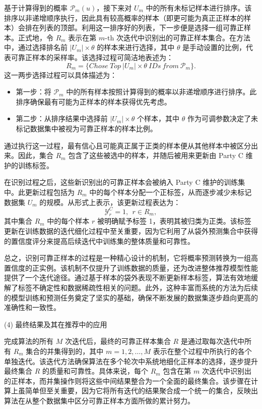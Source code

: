 基于计算得到的概率 ${{\mathsf{\mathcal{P}}}_{m}}(u)$，接下来对 ${{U}_{m}}$ 中的所有未标记样本进行排序。该排序以非递增顺序执行，因此具有较高概率的样本（即更可能为真正正样本的样本）会排在列表的顶部。利用这一排序好的列表，下一步便是选择一组可靠正样本。正式地，令 ${{R}_{m}}$ 表示在第 $m\text{-th}$ 次迭代中识别出的可靠正样本集合。在方法中，通过选择排名前 $|{{U}_{m}}|\times \theta$ 的样本来进行选择，其中 $\theta$ 是手动设置的比例，代表可靠正样本的采样率。该选择过程可简洁地表述为：
\begin{equation}
	{{R}_{m}}=\{Chose\ Top\ |{{U}_{m}}|\times \theta \ IDs\ from\ {{\mathsf{\mathcal{P}}}_{m}}\}.
\end{equation}
这一两步选择过程可以具体描述为：
\begin{itemize}
	\item 第一步：将 ${{\mathsf{\mathcal{P}}}_{m}}$ 中的所有样本按照计算得到的概率以非递增顺序进行排序。此排序确保最有可能为正样本的样本获得优先考虑。
	
	\item 第二步：从排序结果中选择前 $|{{U}_{m}}|\times \theta$ 个样本，其中 $\theta$ 作为可调参数决定了未标记数据集中被视为可靠正样本的样本比例。
\end{itemize}
通过执行这一过程，最有信心且可能真正属于正类的样本便从其他样本中被区分出来。因此，集合 ${{R}_{m}}$ 包含了这些被选中的样本，并随后被用来更新由 Party C 维护的训练标签。

在识别过程之后，这些新识别出的可靠正样本会被纳入 Party C 维护的训练集中。此更新过程包括为 ${{R}_{m}}$ 中的每个样本分配一个正标签，从而逐步减少未标记数据集 ${{U}_{m}}$ 的规模。从形式上表示，该更新过程表达为：
\begin{equation}
	\mathsf{\mathcal{Y}}_{r}^{C}=1,\ \ r\in {{R}_{m}},
\end{equation}
其中集合 ${{R}_{m}}$ 中的每个样本 $r$ 被明确赋予标签 1，表明其被归类为正类。该标签更新在训练数据的迭代细化过程中至关重要，因为它利用了从袋外预测集合中获得的置信度评分来提高后续迭代中训练集的整体质量和可靠性。

总之，识别可靠正样本的过程是一种精心设计的机制，它将概率预测转换为一组高置信度的正实例。该机制不仅提升了训练数据的质量，还为改进整体推荐模型性能提供了一个迭代途径。通过基于样本的袋外表现不断更新样本标签，算法有效地缓解了标签不确定性和数据稀疏性相关的问题。此外，这种丰富而系统的方法为后续的模型训练和预测任务奠定了坚实的基础，确保不断发展的数据集逐步趋向更高的准确性和一致性。 

(4) 最终结果及其在推荐中的应用

完成算法的所有 $M$ 次迭代后，最终的可靠正样本集合 $R$ 是通过取每次迭代中所有 ${{R}_{m}}$ 集合的并集得到的，其中 $m = 1, 2, \dots, M$ 表示在整个过程中所执行的各个单独迭代。该迭代方法确保算法在多个轮次中系统地细化正样本的选择，逐步提升最终集合 $R$ 的质量和可靠性。具体来说，每个 ${{R}_{m}}$ 包含在第 $m$ 次迭代中识别出的正样本，而并集操作则将这些中间结果整合为一个全面的最终集合。该步骤在计算上虽简单但至关重要，因为它将所有迭代的结果聚合成一个统一的集合，反映出算法在从整个数据集中区分可靠正样本方面所做的累计努力。

